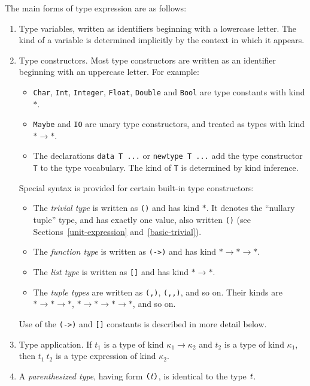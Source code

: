 The main forms of type expression are as follows:\nopagebreak[4]
\begin{enumerate}

\item Type variables, written as identifiers beginning with
      a lowercase letter.  The kind of a variable is determined implicitly
      by the context in which it appears.

\item Type constructors.  Most type constructors are written as an identifier
      beginning with an uppercase letter.  For example:\nopagebreak[4]
      \begin{itemize}
      \item \mbox{\tt Char}, \mbox{\tt Int}, \mbox{\tt Integer}, \mbox{\tt Float}, \mbox{\tt Double} and \mbox{\tt Bool} are
            type constants with kind $\ast$.
      \item \mbox{\tt Maybe} and \mbox{\tt IO} are unary type
            constructors, and treated as types with
            kind $\ast\rightarrow\ast$.
      \item The declarations \mbox{\tt data\ T\ ...} or \mbox{\tt newtype\ T\ ...} add the type
            constructor \mbox{\tt T} to
            the type vocabulary.  The kind of \mbox{\tt T} is determined by
            kind inference.
      \end{itemize}
      Special syntax is provided for certain built-in type constructors:\nopagebreak[4]
      \begin{itemize}
      \item The {\em trivial type} is written as \mbox{\tt ()} and
            has kind $\ast$.
            It denotes the ``nullary tuple'' type, and has exactly one value,
            also written \mbox{\tt ()} (see Sections~\ref{unit-expression}
            and~\ref{basic-trivial}).
      \item The {\em function type} is written as \mbox{\tt (->)} and has
            kind $\ast\rightarrow\ast\rightarrow\ast$.
      \item The {\em list type}  is written as \mbox{\tt []} and has kind
            $\ast\rightarrow\ast$.
      \item The {\em tuple types} are written as \mbox{\tt (,)},
            \mbox{\tt (,,)}, and so on.  Their kinds are
            $\ast\rightarrow\ast\rightarrow\ast$,
            $\ast\rightarrow\ast\rightarrow\ast\rightarrow\ast$,  and
            so on.
      \end{itemize}
      Use of the \mbox{\tt (->)} and \mbox{\tt []} constants is described in more detail below.

\item Type application.  If $t_1$ is a type of kind
      $\kappa_1\rightarrow\kappa_2$ and $t_2$ is a type of kind $\kappa_1$,
      then $t_1~t_2$ is a type expression of kind $\kappa_2$.

\item A {\em parenthesized type}, having form \mbox{$\it \makebox{\tt (}t\makebox{\tt )}$}, is identical
      to the type \mbox{$\it t$}.

\end{enumerate}
